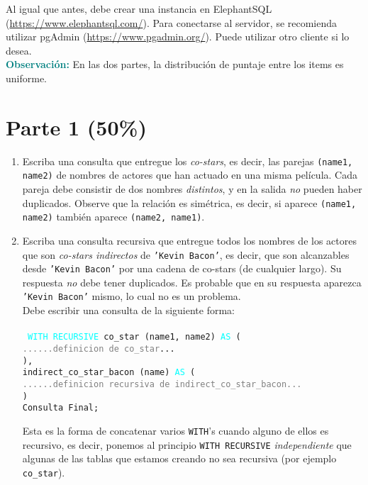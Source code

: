 \documentclass[11pt,a4paper]{article}
\begin{document}
Al igual que antes, debe crear una instancia en  ElephantSQL (\href{https://www.elephantsql.com/}{https://www.elephantsql.com/}). 
Para conectarse al servidor, se recomienda utilizar pgAdmin (\href{https://www.pgadmin.org/}{https://www.pgadmin.org/}). Puede utilizar otro cliente si lo desea. \\

\noindent
\textcolor{teal}{{\bf Observación:}} En las dos partes, la distribución de puntaje entre los items es uniforme.  

\section*{Parte 1 (50\%)} 

\begin{enumerate}
\item Escriba una consulta que entregue los \emph{co-stars}, es decir, las parejas {\tt (name1, name2)} de nombres de actores que han actuado en una misma película. Cada pareja debe consistir de dos nombres \emph{distintos}, y en la salida \emph{no} pueden haber duplicados. Observe que la relación es simétrica, es decir, si aparece {\tt (name1, name2)} también aparece {\tt (name2, name1)}. 

\item Escriba una consulta recursiva que entregue todos los nombres de los actores que son \emph{co-stars indirectos} de {\tt 'Kevin Bacon'}, es decir, que son alcanzables desde {\tt 'Kevin Bacon'} por una cadena de co-stars (de cualquier largo). Su respuesta \emph{no} debe tener duplicados. Es probable que en su respuesta aparezca {\tt 'Kevin Bacon'} mismo, lo cual no es un problema. \\

Debe escribir una consulta de la siguiente forma:\\\\
{\tt
\textcolor{cyan}{WITH RECURSIVE} co\_star (name1, name2) \textcolor{cyan}{AS} (\\
\textcolor{gray}{......definicion de co\_star}...\\
), \\
indirect\_co\_star\_bacon (name) \textcolor{cyan}{AS} (\\
\textcolor{gray}{......definicion recursiva de indirect\_co\_star\_bacon...}\\
)\\
Consulta Final;\\
}

Esta es la forma de concatenar varios {\tt WITH}'s cuando alguno de ellos es recursivo, es decir, ponemos al principio {\tt WITH RECURSIVE} \emph{independiente} que algunas de las tablas que estamos creando no sea recursiva (por ejemplo {\tt co\_star}). 



\end{enumerate}
\end{document}
